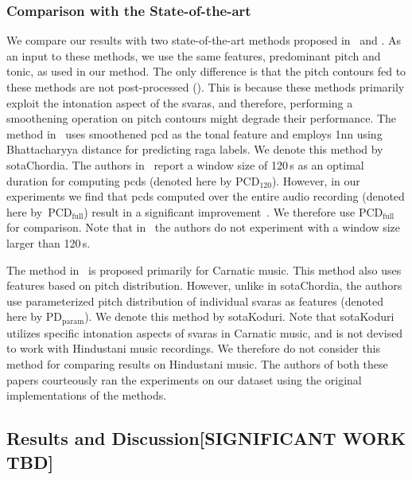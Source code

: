 \subsubsection{Comparison with the State-of-the-art}
\label{sec:raga_rec_pattern_comparison_sota}

We compare our results with two state-of-the-art methods proposed in~\citep{chordia2013joint} and \citep{koduri2014intonation}. As an input to these methods, we use the same features, predominant pitch and tonic, as used in our method. The only difference is that the pitch contours fed to these methods are not post-processed (). This is because these methods primarily exploit the intonation aspect of the \glspl{svara}, and therefore, performing a smoothening operation on pitch contours might degrade their performance. The method in~\cite{chordia2013joint} uses smoothened \acrfull{pcd} as the tonal feature and employs \acrfull{1nn} using Bhattacharyya distance for predicting \gls{raga} labels. We denote this method by \acrshort{sotaChordia}. The authors in~\cite{chordia2013joint} report a window size of 120\,s as an optimal duration for computing \glspl{pcd} (denoted here by $\mathrm{PCD}_{120}$). However, in our experiments we find that \glspl{pcd} computed over the entire audio recording (denoted here by~$\mathrm{PCD}_\mathrm{full}$) result in a significant improvement~\citep{gulatiphrase_2016}. We therefore use $\mathrm{PCD}_\mathrm{full}$ for comparison. Note that in~\cite{chordia2013joint} the authors do not experiment with a window size larger than 120\,s. 

The method in~\cite{koduri2014intonation} is proposed primarily for Carnatic music. This method also uses features based on pitch distribution. However, unlike in \acrshort{sotaChordia}, the authors use parameterized pitch distribution of individual \glspl{svara} as features (denoted here by $\mathrm{PD}_\mathrm{param}$). We denote this method by \acrshort{sotaKoduri}. Note that \acrshort{sotaKoduri} utilizes specific intonation aspects of \glspl{svara} in Carnatic music, and is not devised to work with Hindustani music recordings. We therefore do not consider this method for comparing results on Hindustani music. The authors of both these papers courteously ran the experiments on our dataset using the original implementations of the methods. 


\subsection{Results and Discussion[SIGNIFICANT WORK TBD]}
\label{sec:vsm_eval_results}

